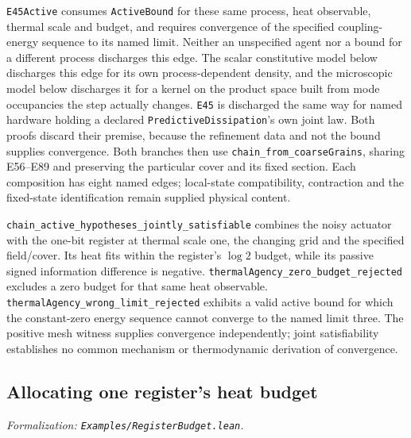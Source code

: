 \documentclass{article}
\begin{document}
\texttt{E45Active} consumes \texttt{ActiveBound} for these same process, heat observable, thermal scale and budget, and requires convergence of the specified coupling-energy sequence to its named limit. Neither an unspecified agent nor a bound for a different process discharges this edge. The scalar constitutive model below discharges this edge for its own process-dependent density, and the microscopic model below discharges it for a kernel on the product space built from mode occupancies the step actually changes. \texttt{E45} is discharged the same way for named hardware holding a declared \texttt{PredictiveDissipation}'s own joint law. Both proofs discard their premise, because the refinement data and not the bound supplies convergence. Both branches then use \nolinkurl{chain_from_coarseGrains}, sharing E56--E89 and preserving the particular cover and its fixed section. Each composition has eight named edges; local-state compatibility, contraction and the fixed-state identification remain supplied physical content.

\nolinkurl{chain_active_hypotheses_jointly_satisfiable} combines the noisy actuator with the one-bit register at thermal scale one, the changing grid and the specified field/cover. Its heat fits within the register's $\log2$ budget, while its passive signed information difference is negative. \nolinkurl{thermalAgency_zero_budget_rejected} excludes a zero budget for that same heat observable. \nolinkurl{thermalAgency_wrong_limit_rejected} exhibits a valid active bound for which the constant-zero energy sequence cannot converge to the named limit three. The positive mesh witness supplies convergence independently; joint satisfiability establishes no common mechanism or thermodynamic derivation of convergence.

\subsection{Allocating one register's heat budget}
\label{sec:supp-ledger}

\textit{Formalization: \texttt{Examples/RegisterBudget.lean}.}
\end{document}
